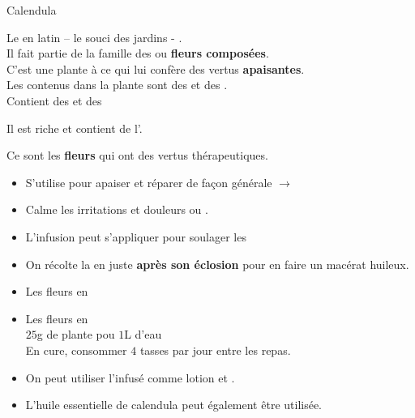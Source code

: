 

\label{calendula}
\renewcommand{\cita}{
    \phantom{a}\citer{Calendula, le souci qui chasse les soucis, est un guérisseur du cœur aussi bien que du corps.}{}
}
\ficheidentiteplante
{Calendula}
{%
    Le  en latin  – le souci des jardins - .\\
    Il fait partie de la famille des  ou \textbf{fleurs composées}.\\

    C'est une plante à  ce qui lui confère des vertus \textbf{apaisantes}.\\

    Les  contenus dans la plante sont des  et des .\\

    Contient des  et des 

    Il est riche  et contient de l'.



}
{%
    Ce sont les \textbf{fleurs} qui ont des vertus thérapeutiques.
    \begin{itemize}[label = \bcplume]
        \item S'utilise pour apaiser et réparer de façon générale $\longrightarrow$ 
        \item Calme les irritations et douleurs  ou .
        \item L'infusion peut s'appliquer pour soulager les 
    \end{itemize}
}
{%
    \begin{itemize}[label = \bcplume]
        \item On récolte la  en  juste \textbf{après son éclosion} pour en faire un macérat huileux. 
    \end{itemize}
}
{%
    \begin{itemize}[label = \bccrayon]
        \item Les fleurs en 
        \item Les fleurs en \\
                $25$g de plante pou $1$L d'eau\\
                En cure, consommer $4$ tasses par jour entre les repas.
        \item On peut utiliser l'infusé comme lotion  et  .
        \item L'huile essentielle de calendula peut également être utilisée.
    \end{itemize}
}
